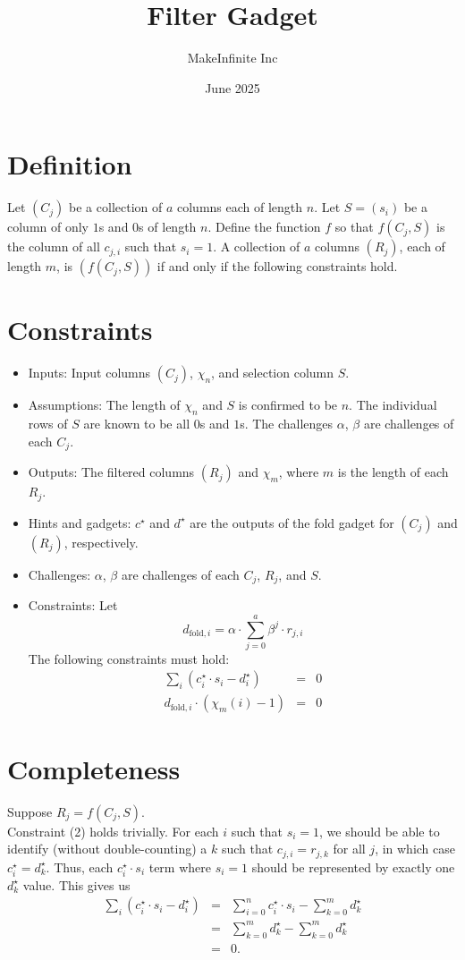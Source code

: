 \documentclass[11pt]{article}
\title{Filter Gadget}
\author{MakeInfinite Inc}
\date{June 2025}
\begin{document}
\maketitle

\section{Definition}
\noindent Let $(C_j)$ be a collection of $a$ columns each of length $n$. Let $S=(s_i)$ be a column of only $1$s and $0$s of length $n$. Define the function $f$ so that $f(C_j, S)$ is the column of all $c_{j,i}$ such that $s_i=1$. A collection of $a$ columns $(R_j)$, each of length $m$, is $(f(C_j, S))$ if and only if the following constraints hold.
\section{Constraints}
\begin{itemize}
    \item Inputs: Input columns $(C_j)$, $\chi_n$, and selection column $S$.
    \item Assumptions: The length of $\chi_n$ and $S$ is confirmed to be $n$. The individual rows of $S$ are known to be all $0$s and $1$s. The challenges $\alpha$, $\beta$ are challenges of each $C_j$.
    \item Outputs: The filtered columns $(R_j)$ and $\chi_m$, where $m$ is the length of each $R_j$.
    \item Hints and gadgets: $c^\star$ and $d^\star$ are the outputs of the fold gadget for $(C_j)$ and $(R_j)$, respectively.
    \item Challenges: $\alpha$, $\beta$ are challenges of each $C_j$, $R_j$, and $S$.
    \item Constraints: Let
    $$d_{\text{fold},i}=\alpha\cdot\sum_{j=0}^a \beta^j\cdot r_{j,i}$$
    The following constraints must hold:
    \begin{eqnarray}
    \sum_{i} (c^\star_i\cdot s_i-d^\star_i)&=&0\\
    d_{\text{fold},i}\cdot(\chi_m(i)-1)&=&0
\end{eqnarray}
\end{itemize}
\section{Completeness}
Suppose $R_j=f(C_j, S)$.\\
Constraint (2) holds trivially. For each $i$ such that $s_i=1$, we should be able to identify (without double-counting) a $k$ such that $c_{j,i}=r_{j,k}$ for all $j$, in which case $c^\star_i=d^\star_k$. Thus, each $c^\star_i\cdot s_i$ term where $s_i=1$ should be represented by exactly one $d^\star_k$ value. This gives us
\begin{eqnarray*}
\sum_{i} (c^\star_i\cdot s_i-d^\star_i)&=&\sum_{i=0}^n c^\star_i\cdot s_i-\sum_{k=0}^m d^\star_k\\
&=&\sum_{k=0}^m d^\star_k-\sum_{k=0}^m d^\star_k\\
&=&0.
\end{eqnarray*}
\end{document}
